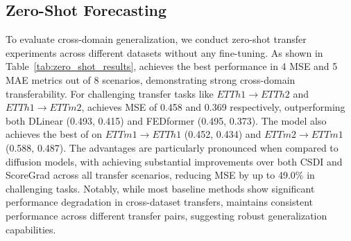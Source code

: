 


\subsection{Zero-Shot Forecasting}
To evaluate cross-domain generalization, we conduct zero-shot transfer experiments across different datasets without any fine-tuning. As shown in Table~\ref{tab:zero_shot_results}, \model achieves the best performance in 4 MSE and 5 MAE metrics out of 8 scenarios, demonstrating strong cross-domain transferability. For challenging transfer tasks like $ETTh1\rightarrow ETTh2$ and $ETTh1\rightarrow ETTm2$, \model achieves MSE of 0.458 and 0.369 respectively, outperforming both DLinear (0.493, 0.415) and FEDformer (0.495, 0.373). The model also achieves the best of on $ETTm1\rightarrow ETTh1$ (0.452, 0.434) and $ETTm2\rightarrow ETTm1$ (0.588, 0.487). The advantages are particularly pronounced when compared to diffusion models, with \model achieving substantial improvements over both CSDI and ScoreGrad across all transfer scenarios, reducing MSE by up to 49.0\% in challenging tasks. Notably, while most baseline methods show significant performance degradation in cross-dataset transfers, \model maintains consistent performance across different transfer pairs, suggesting robust generalization capabilities. %


